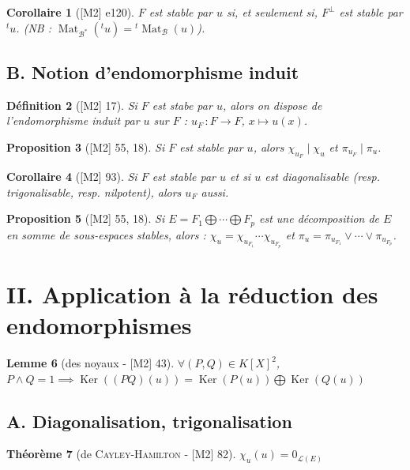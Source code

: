 \documentclass[10pt, a4paper, parskip=full, twoside, twocolumn]{report}
\newtheorem{definition}{Définition}
\newtheorem{theorem}[definition]{Théorème}
\newtheorem{proposition}[definition]{Proposition}
\newtheorem{lemma}[definition]{Lemme}
\newtheorem{corollary}[definition]{Corollaire}
\DeclareMathOperator{\Ker}{Ker}
\DeclareMathOperator{\Mat}{Mat}
\begin{document}
\begin{corollary}[\textnormal{[M2] e120}]
	$F$ est stable par $u$ si, et seulement si, $F^{\perp}$ est stable par ${}^tu$.
	(NB : $\Mat_{\mathcal{B}^*}({}^t u) = {}^t\Mat_{\mathcal{B}}(u)$).
\end{corollary}

\subsection*{B. Notion d'endomorphisme induit}
\begin{definition}[\textnormal{[M2] 17}]
	Si $F$ est stabe par $u$, alors on dispose de \emph{l'endomorphisme induit par $u$ sur $F$} :
	$u_F\,\colon F\to F$, $x\mapsto u(x)$.
\end{definition}

\begin{proposition}[\textnormal{[M2] 55, 18}]
	Si $F$ est stable par $u$, alors $\chi_{u_F} \mid \chi_u$ et $\pi_{u_F}\mid \pi_u$.
\end{proposition}

\begin{corollary}[\textnormal{[M2] 93}]
	Si $F$ est stable par $u$ et si $u$ est diagonalisable (resp. trigonalisable, resp. nilpotent), alors $u_F$ aussi.
\end{corollary}

\begin{proposition}[\textnormal{[M2] 55, 18}]
	Si $E=F_1\bigoplus \cdots \bigoplus F_p$ est une décomposition de $E$ en somme de sous-espaces stables, alors :
	$\chi_u = \chi_{u_{F_1}}\cdots \chi_{u_{F_p}}$ et $\pi_u = \pi_{u_{F_1}}\vee \cdots \vee \pi_{u_{F_p}}$.
\end{proposition}

\section*{II. Application à la réduction des endomorphismes}

\begin{lemma}[des noyaux - \textnormal{[M2] 43}]
	$\forall (P,Q)\in K[X]^2$, $P\wedge Q = 1 \implies \Ker((PQ)(u)) = \Ker(P(u))\bigoplus \Ker(Q(u))$
\end{lemma}

\subsection*{A. Diagonalisation, trigonalisation}
\begin{theorem}[de \textsc{Cayley-Hamilton} - \textnormal{[M2] 82}]
	$\chi_u(u) = 0_{\mathcal{L}(E)}$
\end{theorem}
\end{document}

